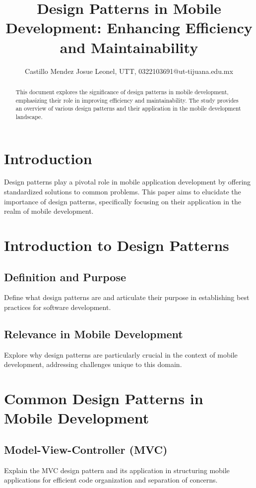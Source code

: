 \documentclass{article}
\title{Design Patterns in Mobile Development: Enhancing Efficiency and Maintainability}
\author{Castillo Mendez Josue Leonel, UTT, 0322103691@ut-tijuana.edu.mx}
\date{}
\begin{document}
	
	\maketitle
	
	\begin{abstract}
		This document explores the significance of design patterns in mobile development, emphasizing their role in improving efficiency and maintainability. The study provides an overview of various design patterns and their application in the mobile development landscape.
	\end{abstract}
	
	\section{Introduction}
	Design patterns play a pivotal role in mobile application development by offering standardized solutions to common problems. This paper aims to elucidate the importance of design patterns, specifically focusing on their application in the realm of mobile development.
	
	\section{Introduction to Design Patterns}
	\subsection{Definition and Purpose}
	Define what design patterns are and articulate their purpose in establishing best practices for software development.
	
	\subsection{Relevance in Mobile Development}
	Explore why design patterns are particularly crucial in the context of mobile development, addressing challenges unique to this domain.
	
	\section{Common Design Patterns in Mobile Development}
	\subsection{Model-View-Controller (MVC)}
	Explain the MVC design pattern and its application in structuring mobile applications for efficient code organization and separation of concerns.
	
\end{document}

